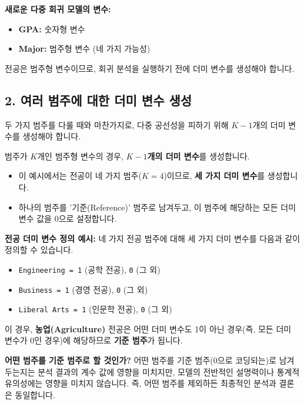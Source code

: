 \documentclass[11pt,a4paper]{book}
\theoremstyle{definition}
\begin{document}
\textbf{새로운 다중 회귀 모델의 변수:}
\begin{itemize}
    \item \textbf{GPA:} 숫자형 변수
    \item \textbf{Major:} 범주형 변수 (네 가지 가능성)
\end{itemize}
전공은 범주형 변수이므로, 회귀 분석을 실행하기 전에 더미 변수를 생성해야 합니다.

\subsection{2. 여러 범주에 대한 더미 변수 생성}
두 가지 범주를 다룰 때와 마찬가지로, 다중 공선성을 피하기 위해 $K-1$개의 더미 변수를 생성해야 합니다.

\begin{tcolorbox}[definition={더미 변수 생성 규칙 (여러 범주)}]
범주가 $K$개인 범주형 변수의 경우, \textbf{$K-1$개의 더미 변수}를 생성합니다.
\begin{itemize}
    \item 이 예시에서는 전공이 네 가지 범주($K=4$)이므로, \textbf{세 가지 더미 변수}를 생성합니다.
    \item 하나의 범주를 '기준(Reference)' 범주로 남겨두고, 이 범주에 해당하는 모든 더미 변수 값을 0으로 설정합니다.
\end{itemize}
\end{tcolorbox}

\textbf{전공 더미 변수 정의 예시:}
네 가지 전공 범주에 대해 세 가지 더미 변수를 다음과 같이 정의할 수 있습니다.
\begin{itemize}
    \item \texttt{Engineering = 1} (공학 전공), \texttt{0} (그 외)
    \item \texttt{Business = 1} (경영 전공), \texttt{0} (그 외)
    \item \texttt{Liberal Arts = 1} (인문학 전공), \texttt{0} (그 외)
\end{itemize}
이 경우, \textbf{농업(Agriculture)} 전공은 어떤 더미 변수도 1이 아닌 경우(즉, 모든 더미 변수가 0인 경우)에 해당하므로 \textbf{기준 범주}가 됩니다.

\begin{infobox}
\textbf{어떤 범주를 기준 범주로 할 것인가?}
어떤 범주를 기준 범주(0으로 코딩되는)로 남겨두는지는 분석 결과의 계수 값에 영향을 미치지만, 모델의 전반적인 설명력이나 통계적 유의성에는 영향을 미치지 않습니다. 즉, 어떤 범주를 제외하든 최종적인 분석과 결론은 동일합니다.
\end{infobox}
\end{document}
